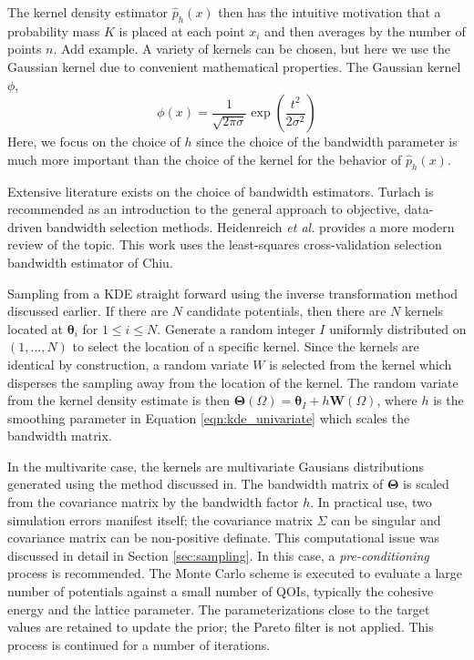 The kernel density estimator $\hat{p}_h(x)$ then has the intuitive motivation that a probability mass $K$ is placed at each point $x_i$ and then averages by the number of points $n$.  Add example.  A variety of kernels can be chosen, but here we use the Gaussian kernel due to convenient mathematical properties.  The Gaussian kernel $\phi$,
\begin{equation}
  \phi(x)=\frac{1}{\sqrt{2\pi\sigma}}\exp{\left(\frac{t^2}{2\sigma^2}\right)}
\end{equation}
Here, we focus on the choice of $h$ since the choice of the bandwidth parameter is much more important than the choice of the kernel for the behavior of $\hat{p}_h(x)$.\cite{silverman1986_kde}

Extensive literature exists on the choice of bandwidth estimators.  Turlach\cite{turlach1993_kde_bw} is recommended as an introduction to the general approach to objective, data-driven bandwidth selection methods.  Heidenreich \emph{et al.}\cite{heidenreich2013_kde_bw} provides a more modern review of the topic.  This work uses the least-squares cross-validation selection bandwidth estimator of Chiu\cite{chiu1991_kde_bw}.

Sampling from a KDE straight forward using the inverse transformation method discussed earlier.  If there are $N$ candidate potentials, then there are $N$ kernels located at $\bm{\theta}_i$ for $1 \leq i \leq N$.  Generate a random integer $I$ uniformly distributed on $(1,...,N)$ to select the location of a specific kernel.  Since the kernels are identical by construction, a random variate $W$ is selected from the kernel which disperses the sampling away from the location of the kernel.  The random variate from the kernel density estimate is then $\bm{\Theta}(\Omega) = \bm{\theta}_I + h\bm{W}(\Omega)$, where $h$ is the smoothing parameter in Equation \ref{eqn:kde_univariate} which scales the bandwidth matrix.

In the multivarite case, the kernels are multivariate Gausians distributions generated using the method discussed in.  The bandwidth matrix of $\bm{\Theta}$ is scaled from the covariance matrix by the bandwidth factor $h$.  In practical use, two simulation errors manifest itself; the covariance matrix $\Sigma$ can be singular and covariance matrix can be non-positive definate.  This computational issue was discussed in detail in Section \ref{sec:sampling}.  In this case, a \emph{pre-conditioning} process is recommended.  The Monte Carlo scheme is executed to evaluate a large number of potentials against a small number of QOIs, typically the cohesive energy and the lattice parameter.  The parameterizations close to the target values are retained to update the prior; the Pareto filter is not applied.  This process is continued for a number of iterations.

